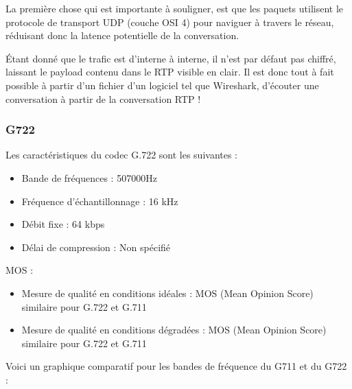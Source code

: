 \documentclass[letterpaper,10pt,french]{sphinxmanual}
\begin{document}
\sphinxAtStartPar
La première chose qui est importante à souligner, est que les paquets utilisent le protocole de transport UDP (couche OSI 4) pour naviguer à travers le réseau, réduisant donc la latence potentielle de la conversation.

\sphinxAtStartPar
Étant donné que le trafic est d’interne à interne, il n’est par défaut pas chiffré, laissant le payload contenu dans le RTP visible en clair.
Il est donc tout à fait possible à partir d’un fichier d’un logiciel tel que Wireshark, d’écouter une conversation à partir de la conversation RTP !

\noindent{}


\subsubsection{G722}
\label{\detokenize{Documentation-M362:g722}}
\sphinxAtStartPar
Les caractéristiques du codec G.722 sont les suivantes :
\begin{itemize}
\item {} 
\sphinxAtStartPar
Bande de fréquences : 50\sphinxhyphen{}7000Hz

\item {} 
\sphinxAtStartPar
Fréquence d’échantillonnage : 16 kHz

\item {} 
\sphinxAtStartPar
Débit fixe : 64 kbps

\item {} 
\sphinxAtStartPar
Délai de compression : Non spécifié

\end{itemize}

\sphinxAtStartPar
MOS :
\begin{itemize}
\item {} 
\sphinxAtStartPar
Mesure de qualité en conditions idéales : MOS (Mean Opinion Score) similaire pour G.722 et G.711

\item {} 
\sphinxAtStartPar
Mesure de qualité en conditions dégradées : MOS (Mean Opinion Score) similaire pour G.722 et G.711

\end{itemize}

\sphinxAtStartPar
Voici un graphique comparatif pour les bandes de fréquence du G711 et du G722 :

\noindent{}
\end{document}
